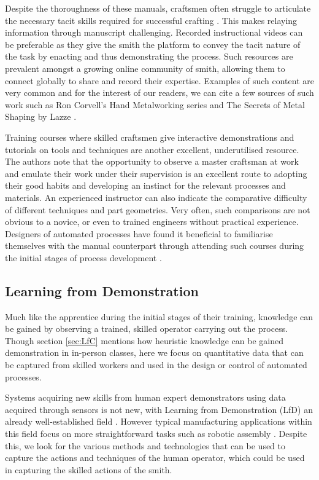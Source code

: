 Despite the thoroughness of these manuals, craftsmen often struggle to articulate the necessary tacit skills required for successful crafting \citep{Wood2009ACraftsmen}. This makes relaying information through manuscript challenging. Recorded instructional videos can be preferable as they give the smith the platform to convey the tacit nature of the task by enacting and thus demonstrating the process. Such resources are prevalent amongst a growing online community of smith, allowing them to connect globally to share and record their expertise. Examples of such content are very common and for the interest of our readers, we can cite a few sources of such work such as Ron Corvell's Hand Metalworking series \citep{CorvellRonSeries} and The Secrets of Metal Shaping by Lazze \citep{LazzeTheShaping}.

Training courses where skilled craftsmen give interactive demonstrations and tutorials on tools and techniques are another excellent, underutilised resource. The authors note that the opportunity to observe a master craftsman at work and emulate their work under their supervision is an excellent route to adopting their good habits and developing an instinct for the relevant processes and materials. An experienced instructor can also indicate the comparative difficulty of different techniques and part geometries. Very often, such comparisons are not obvious to a novice, or even to trained engineers without practical experience. Designers of automated processes have found it beneficial to familiarise themselves with the manual counterpart through attending such courses during the initial stages of process development \citep{Ilangovan2016FixturelessForming}.

\subsection{Learning from Demonstration} \label{sec:LfD} 
Much like the apprentice during the initial stages of their training, knowledge can be gained by observing a trained, skilled operator carrying out the process. Though section \ref{sec:LfC} mentions how heuristic knowledge can be gained demonstration in in-person classes, here we focus on quantitative data that can be captured from skilled workers and used in the design or control of automated processes.

Systems acquiring new skills from human expert demonstrators using data acquired through sensors is not new, with Learning from Demonstration (LfD)  an already well-established field \citep{Ravichandar2020RecentDemonstration}. 
However typical manufacturing applications within this field focus on more straightforward tasks such as robotic assembly \citep{Zhu2018RobotSurvey}. Despite this, we look for the various methods and technologies that can be used to capture the actions and techniques of the human operator, which could be used in capturing the skilled actions of the smith.

